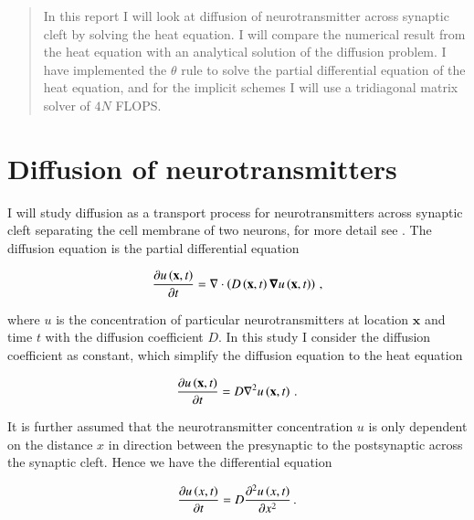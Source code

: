 \documentclass[11pt,english,a4paper]{article}
\begin{document}
\maketitle
\begin{flushleft}

\begin{abstract}
In this report I will look at diffusion of neurotransmitter across synaptic cleft by solving the heat equation. I will compare the numerical result from the heat equation with an analytical solution of the diffusion problem. I have implemented the $\theta$ rule to solve the partial differential equation of the heat equation, and for the implicit schemes I will use a tridiagonal matrix solver of $4N$ FLOPS.
\end{abstract}

\section{Diffusion of neurotransmitters}

I will study diffusion as a transport process for neurotransmitters  across synaptic cleft separating the cell membrane of two neurons, for more detail see \cite{project4}. The diffusion equation is the partial differential equation 

\begin{align*}
\frac{\partial u\left({\textbf{x},t}\right)}{\partial t} = \nabla \cdot\left({D\left({\textbf{x},t}\right)\boldsymbol{\nabla} u\left({\textbf{x},t}\right)}\right)\,,
\end{align*}

where $u$ is the concentration of particular neurotransmitters at location $\textbf{x}$ and time $t$ with the diffusion coefficient $D$. In this study I consider the diffusion coefficient as constant, which simplify the diffusion equation to the heat equation

\begin{align*}
\frac{\partial u\left({\textbf{x},t}\right)}{\partial t} = D\nabla^2 u\left({\textbf{x},t}\right)\,.
\end{align*}

It is further assumed that the neurotransmitter concentration $u$ is only dependent on the distance $x$ in direction between the presynaptic to the postsynaptic across the synaptic cleft. Hence we have the differential equation

\begin{align}
\frac{\partial u\left({x,t}\right)}{\partial t} = D\frac{\partial^2 u\left({x,t}\right)}{\partial x^2}\,.
\label{eq_1}
\end{align}


\end{flushleft}
\end{document}
